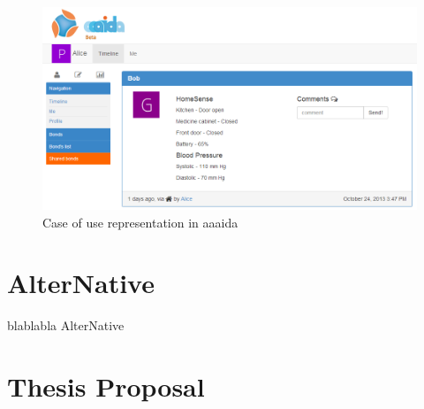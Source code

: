 \begin{figure}[H]\begin{center}
 \centering
  \captionsetup{justification=centering}
  \includegraphics[width=1\textwidth]{pictures/proposal/aaaida-use-case}
  \caption{Case of use representation in aaaida \label{fig:network-architecture}}
\end{center}\end{figure}



\section{AlterNative}\label{S:AlterNative}
blablabla AlterNative

\section{Thesis Proposal}\label{S:Thesis-Proposal}
